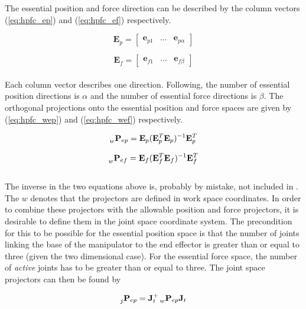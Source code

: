 The essential position and force direction can be described by the column vectors (\ref{eq:hpfc_ep}) and (\ref{eq:hpfc_ef}) respectively.

\begin{equation}\label{eq:hpfc_ep}
    \mathbf{E}_p =
    \begin{bmatrix}
        \mathbf{e}_{p1} & ... & \mathbf{e}_{p\alpha}
    \end{bmatrix}
\end{equation}

\begin{equation}\label{eq:hpfc_ef}
    \mathbf{E}_f =
    \begin{bmatrix}
        \mathbf{e}_{f1} & ... & \mathbf{e}_{f\beta}
    \end{bmatrix}
\end{equation}
\\
Each column vector describes one direction. Following, the number of essential position directions is $\alpha$ and the number of essential force directions is $\beta$. The orthogonal projections onto the essential position and force spaces are given by (\ref{eq:hpfc_wep}) and (\ref{eq:hpfc_wef}) respectively.

\begin{equation}\label{eq:hpfc_wep}
    \prescript{}{w}{\mathbf{P}}_{ep} = \mathbf{E}_p(\mathbf{E}_p^T \mathbf{E}_p)^{-1} \mathbf{E}_p^T
\end{equation}

\begin{equation}\label{eq:hpfc_wef}
    \prescript{}{w}{\mathbf{P}}_{ef} = \mathbf{E}_f(\mathbf{E}_f^T \mathbf{E}_f)^{-1} \mathbf{E}_f^T
\end{equation}
\\
The inverse in the two equations above is, probably by mistake, not included in \cite{west1985method}. The $w$ denotes that the projectors are defined in work space coordinates. In order to combine these projectors with the allowable position and force projectors, it is desirable to define them in the joint space coordinate system. The precondition for this to be possible for the essential position space is that the number of joints linking the base of the manipulator to the end effector is greater than or equal to three (given the two dimensional case). For the essential force space, the number of \textit{active} joints has to be greater than or equal to three. The joint space projectors can then be found by

\begin{equation}\label{eq:hpfc_jep}
    \prescript{}{j}{\mathbf{P}}_{ep} = \mathbf{J}_t^+ \prescript{}{w}{\mathbf{P}}_{ep} \mathbf{J}_t
\end{equation}

